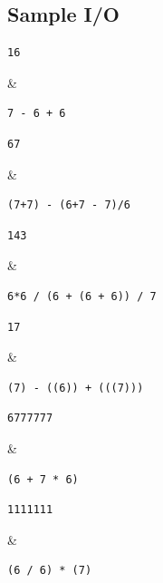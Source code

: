 
\subsection*{Sample I/O}

\begin{sampleIO}
\begin{verbatim}
16
\end{verbatim}
&
\begin{verbatim}
7 - 6 + 6
\end{verbatim}
\end{sampleIO}

\begin{sampleIO}
\begin{verbatim}
67
\end{verbatim}
&
\begin{verbatim}
(7+7) - (6+7 - 7)/6
\end{verbatim}
\end{sampleIO}


\begin{sampleIO}
\begin{verbatim}
143
\end{verbatim}
&
\begin{verbatim}
6*6 / (6 + (6 + 6)) / 7
\end{verbatim}
\end{sampleIO}


\begin{sampleIO}
\begin{verbatim}
17
\end{verbatim}
&
\begin{verbatim}
(7) - ((6)) + (((7)))
\end{verbatim}
\end{sampleIO}


\begin{sampleIO}
\begin{verbatim}
6777777
\end{verbatim}
&
\begin{verbatim}
(6 + 7 * 6)
\end{verbatim}
\end{sampleIO}


\begin{sampleIO}
\begin{verbatim}
1111111
\end{verbatim}
&
\begin{verbatim}
(6 / 6) * (7)
\end{verbatim}
\end{sampleIO}



